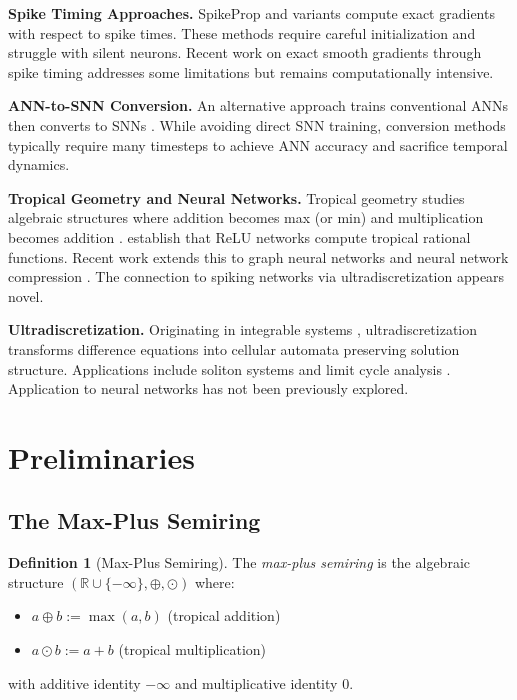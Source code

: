 \documentclass{article}
\theoremstyle{plain}
\theoremstyle{definition}
\newtheorem{definition}[theorem]{Definition}
\theoremstyle{remark}
\newcommand{\R}{\mathbb{R}}
\begin{document}
\textbf{Spike Timing Approaches.} SpikeProp \citep{bohte2002error} and variants \citep{mostafa2018supervised, kheradpisheh2020temporal} compute exact gradients with respect to spike times. These methods require careful initialization and struggle with silent neurons. Recent work on exact smooth gradients through spike timing \citep{goltz2021fast} addresses some limitations but remains computationally intensive.

\textbf{ANN-to-SNN Conversion.} An alternative approach trains conventional ANNs then converts to SNNs \citep{cao2015spiking, rueckauer2017conversion, bu2022optimal}. While avoiding direct SNN training, conversion methods typically require many timesteps to achieve ANN accuracy and sacrifice temporal dynamics.

\textbf{Tropical Geometry and Neural Networks.} Tropical geometry studies algebraic structures where addition becomes max (or min) and multiplication becomes addition \citep{maclagan2015introduction}. \citet{zhang2018tropical} establish that ReLU networks compute tropical rational functions. Recent work extends this to graph neural networks \citep{pham2024gnn} and neural network compression \citep{fotopoulos2024tropnnc}. The connection to spiking networks via ultradiscretization appears novel.

\textbf{Ultradiscretization.} Originating in integrable systems \citep{tokihiro1996ultra}, ultradiscretization transforms difference equations into cellular automata preserving solution structure. Applications include soliton systems \citep{takahashi1990soliton} and limit cycle analysis \citep{yamazaki2023emergence, yamazaki2024generalization}. Application to neural networks has not been previously explored.

\section{Preliminaries}
\label{sec:prelim}

\subsection{The Max-Plus Semiring}
\label{sec:maxplus}

\begin{definition}[Max-Plus Semiring]
The \emph{max-plus semiring} is the algebraic structure $(\R \cup \{-\infty\}, \oplus, \odot)$ where:
\begin{itemize}
    \item $a \oplus b := \max(a, b)$ (tropical addition)
    \item $a \odot b := a + b$ (tropical multiplication)
\end{itemize}
with additive identity $-\infty$ and multiplicative identity $0$.
\end{definition}
\end{document}
